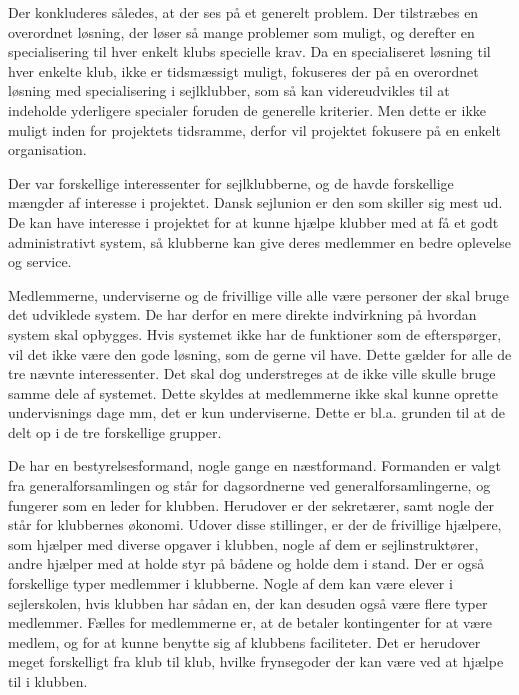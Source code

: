 \cbstart
\cbdelete
Der konkluderes således, at der ses på et generelt problem. Der tilstræbes en overordnet løsning, der løser så mange problemer som muligt, og derefter en specialisering til hver enkelt klubs specielle krav. Da en specialiseret løsning til hver enkelte klub, ikke er tidsmæssigt muligt, fokuseres der på en overordnet løsning med specialisering i sejlklubber, som så kan videreudvikles til at indeholde yderligere specialer foruden de generelle kriterier. Men dette er ikke muligt inden for projektets tidsramme, derfor vil projektet fokusere på en enkelt organisation.
\cbdelete
\cbend

\cbstart
Der var forskellige interessenter for sejlklubberne, og de havde forskellige mængder af interesse i projektet. Dansk sejlunion er den som skiller sig mest ud. De kan have interesse i projektet for at kunne hjælpe klubber med at få et godt administrativt system, så klubberne kan give deres medlemmer en bedre oplevelse og service.
\cbend

Medlemmerne, underviserne og de frivillige ville alle være personer der skal bruge det udviklede system. De har derfor en mere direkte indvirkning på hvordan system skal opbygges. Hvis systemet ikke har de funktioner som de efterspørger, vil det ikke være den gode løsning, som de gerne vil have. Dette gælder for alle de tre nævnte interessenter. Det skal dog understreges at de ikke ville skulle bruge samme dele af systemet. Dette skyldes at medlemmerne ikke skal kunne oprette undervisnings dage mm, det er kun underviserne. Dette er bl.a. grunden til at de delt op i de tre forskellige grupper. 

\cbstart
\cbdelete
De har en bestyrelsesformand, nogle gange en næstformand. Formanden er valgt fra generalforsamlingen og står for
dagsordnerne ved generalforsamlingerne, og fungerer som en leder for klubben. Herudover er der sekretærer, samt nogle
der står for klubbernes økonomi. Udover disse stillinger, er der de frivillige hjælpere, som hjælper med diverse opgaver
i klubben, nogle af dem er sejlinstruktører, andre hjælper med at holde styr på bådene og holde dem i stand. Der er også
forskellige typer medlemmer i klubberne. Nogle af dem kan være elever i sejlerskolen, hvis klubben har sådan en, der kan
desuden også være flere typer medlemmer. Fælles for medlemmerne er, at de betaler kontingenter for at være medlem, og for
at kunne benytte sig af klubbens faciliteter. Det er herudover meget forskelligt fra klub til klub, hvilke frynsegoder
der kan være ved at hjælpe til i klubben.
\cbdelete
\cbend

